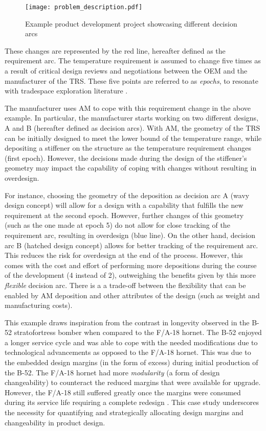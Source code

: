 \begin{figure}[h!]
	\centering
	\texttt{[image: problem\_description.pdf]}
	\caption{Example product development project showcasing different decision arcs}
	\label{fig:problemdescription}
\end{figure}

These changes are represented by the red line, hereafter defined as the requirement arc. The temperature requirement is assumed to change five times as a result of critical design reviews \cite{Cooper2008} and negotiations between the OEM and the manufacturer of the \ac{TRS}. These five points are referred to as \textit{epochs}, to resonate with tradespace exploration literature \cite{McManus2007}.  

The manufacturer uses \ac{AM} to cope with this requirement change in the above example. In particular, the manufacturer starts working on two different designs, A and B (hereafter defined as decision arcs). With \ac{AM}, the geometry of the \ac{TRS} can be initially designed to meet the lower bound of the temperature range, while depositing a stiffener on the structure as the temperature requirement changes (first epoch). However, the decisions made during the design of the stiffener's geometry may impact the capability of coping with changes without resulting in overdesign. 

For instance, choosing the geometry of the deposition as decision arc A (wavy design concept) will allow for a design with a capability that fulfills the new requirement at the second epoch. However, further changes of this geometry (such as the one made at epoch 5) do not allow for close tracking of the requirement arc, resulting in overdesign (blue line). On the other hand, decision arc B (hatched design concept) allows for better tracking of the requirement arc. This reduces the risk for overdesign at the end of the process. However, this comes with the cost and effort of performing more depositions during the course of the development (4 instead of 2), outweighing the benefits given by this more \textit{flexible} decision arc. There is a a trade-off between the flexibility that can be enabled by \ac{AM} deposition and other attributes of the design (such as weight and manufacturing costs).

This example draws inspiration from the contrast in longevity observed in the B-52 stratofortress bomber when compared to the F/A-18 hornet. The B-52 enjoyed a longer service cycle and was able to cope with the needed modifications due to technological advancements as opposed to the F/A-18 hornet. This was due to the embedded design margins (in the form of excess) during initial production of the B-52. The F/A-18 hornet had more \textit{modularity} (a form of design changeability) to counteract the reduced margins that were available for upgrade. However, the F/A-18 still suffered greatly once the margins were consumed during its service life requiring a complete redesign \cite{Long2017}. This case study underscores the necessity for quantifying and strategically allocating design margins and changeability in product design.

